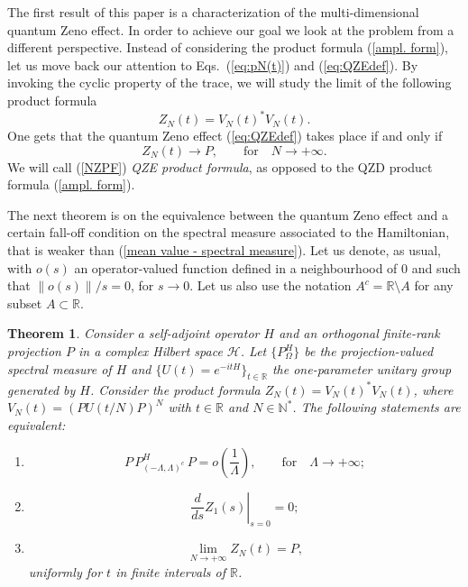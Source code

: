 \documentclass[aip,jmp
]{revtex4}
\newcommand{\RM}{\mathbb{R}}
\newcommand{\NM}{\mathbb{N}}
\newtheorem{theorem}{Theorem}
\theoremstyle{definition}
\begin{document}
The first result of this paper is a characterization of the multi-dimensional quantum Zeno
effect. In order to achieve our goal we look at the problem from a different perspective. Instead of considering the product formula (\ref{ampl. form}), let us move back our attention to Eqs.~(\ref{eq:pN(t)}) and (\ref{eq:QZEdef}). By invoking the cyclic property of the trace, we will study the limit of the following product formula
\begin{equation}\label{NZPF}
Z_N(t)=V_{N}(t)^{*}V_{N}(t).
\end{equation}
One gets that the quantum Zeno effect (\ref{eq:QZEdef}) takes place if and only if
\begin{equation}
\label{eq:limit NZPF}
Z_N(t) \to P, \qquad \text{for} \quad N\to +\infty .
\end{equation}
We will call (\ref{NZPF}) \emph{QZE product formula}, as opposed to the QZD product formula (\ref{ampl. form}).




The next theorem is on the equivalence between the quantum Zeno effect and a certain fall-off condition on the spectral measure associated to the Hamiltonian,  that is weaker than (\ref{mean value
- spectral measure}).
Let us denote, as usual, with
$o(s)$ an operator-valued function defined in a neighbourhood of $0$ and such that
$\|o(s)\|/s =0$, for $s\to 0$. Let us also use the notation $A^c = \RM\setminus A$ for any subset $A\subset\RM$.


\begin{theorem}\label{iff condition QZE multidimensional}
Consider  a self-adjoint operator  $H$ and an orthogonal
finite-rank projection $P$ in a complex Hilbert space
$\mathcal{H}$. Let  $\{P_{\Omega}^H\}$ be the projection-valued
spectral measure  of $H$ and $\{U(t)=e^{-itH}\}_{t \in \RM}$ the
one-parameter unitary group generated by $H$. Consider the product
formula $Z_N(t)=V_{N}(t)^{*}V_{N}(t)$, where
$V_{N}(t)=(PU(t/N)P)^{N}$ with $t \in \RM$ and $N \in \NM^*$. The
following statements are equivalent:
\begin{enumerate}
    \item \label{fdtc}
    \begin{equation*}
      P\, P_{(-\Lambda,\Lambda)^c}^H \, P= o\left( \frac{1}{\Lambda} \right), \qquad \mathrm{for} \quad \Lambda \to + \infty;
       \end{equation*}
    \item
      \begin{equation*}
        \left. \frac{d}{ds} Z_1(s) \right|_{s=0}=0;
      \end{equation*}
    \item
    \begin{equation*}
      \lim_{N \to +\infty} Z_{N}(t)=P,
    \end{equation*}
    uniformly for $t$ in finite intervals of $\RM$.
\end{enumerate}
\end{theorem}
\end{document}

